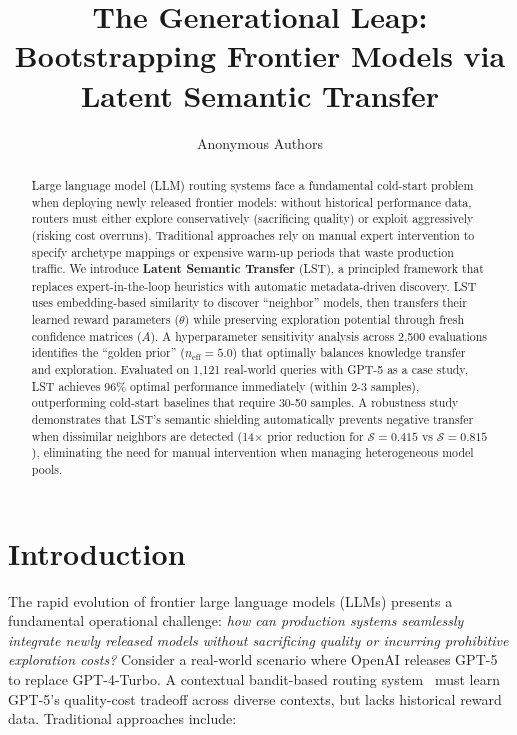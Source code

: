 \documentclass[sigconf,nonacm]{acmart}
\begin{document}
\title{The Generational Leap: Bootstrapping Frontier Models via Latent Semantic Transfer}

\author{Anonymous Authors}

\begin{abstract}
Large language model (LLM) routing systems face a fundamental cold-start problem when deploying newly released frontier models: without historical performance data, routers must either explore conservatively (sacrificing quality) or exploit aggressively (risking cost overruns). Traditional approaches rely on manual expert intervention to specify archetype mappings or expensive warm-up periods that waste production traffic. We introduce \textbf{Latent Semantic Transfer} (LST), a principled framework that replaces expert-in-the-loop heuristics with automatic metadata-driven discovery. LST uses embedding-based similarity to discover ``neighbor'' models, then transfers their learned reward parameters ($\theta$) while preserving exploration potential through fresh confidence matrices ($A$). A hyperparameter sensitivity analysis across 2,500 evaluations identifies the ``golden prior'' ($n_{\text{eff}} = 5.0$) that optimally balances knowledge transfer and exploration. Evaluated on 1,121 real-world queries with GPT-5 as a case study, LST achieves 96\% optimal performance immediately (within 2-3 samples), outperforming cold-start baselines that require 30-50 samples. A robustness study demonstrates that LST's semantic shielding automatically prevents negative transfer when dissimilar neighbors are detected (14$\times$ prior reduction for $\mathcal{S} = 0.415$ vs $\mathcal{S} = 0.815$), eliminating the need for manual intervention when managing heterogeneous model pools.
\end{abstract}


\maketitle

\section{Introduction}

The rapid evolution of frontier large language models (LLMs) presents a fundamental operational challenge: \textit{how can production systems seamlessly integrate newly released models without sacrificing quality or incurring prohibitive exploration costs?} Consider a real-world scenario where OpenAI releases GPT-5 to replace GPT-4-Turbo. A contextual bandit-based routing system~\cite{agarwal2014taming,li2010contextual} must learn GPT-5's quality-cost tradeoff across diverse contexts, but lacks historical reward data. Traditional approaches include:
\end{document}
